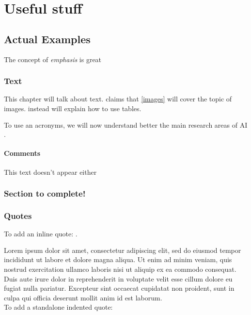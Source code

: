 
\part{Useful stuff}

\chapter{Actual Examples}

The concept of \emph{emphasis} is great

\section{Text}

This chapter will talk about text.
\textcite{QUINN2023} claims that \cref{images} will cover the topic of images.
 instead will explain how to use tables.


To use an acronyms, we will now understand better the main research areas of \ac{AI} \autocite{RUSSELL2020}.

\subsection{Comments}


\begin{ignore}
 This
 text
 doesn't
 appear
 either
\end{ignore}


\section{Section to complete!}


\placeholder

\section{Quotes}

To add an inline quote: .

Lorem ipsum dolor sit amet, consectetur adipiscing elit, sed do eiusmod tempor incididunt ut labore et dolore magna aliqua. Ut enim ad minim veniam, quis nostrud exercitation ullamco laboris nisi ut aliquip ex ea commodo consequat. Duis aute irure dolor in reprehenderit in voluptate velit esse cillum dolore eu fugiat nulla pariatur. Excepteur sint occaecat cupidatat non proident, sunt in culpa qui officia deserunt mollit anim id est laborum.\\
To add a standalone indented quote:

